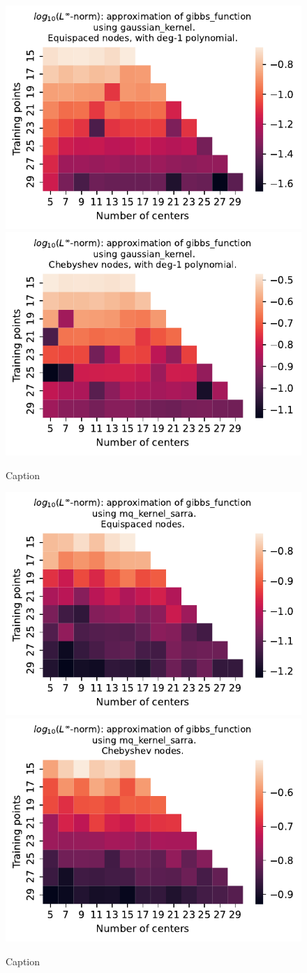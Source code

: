 \documentclass[12pt]{report} %
\begin{document}
\begin{figure}[ht]
  \centering

  \includegraphics[width=.49\textwidth]{imagenes/experiments/1d/variational/gibbs_function-Kgaussian_kernel-Poly-Equi.pdf}
  \includegraphics[width=.49\textwidth]{imagenes/experiments/1d/variational/gibbs_function-Kgaussian_kernel-Poly-Cheb.pdf}
  \caption{Caption}
  \label{fig:gibbs-gaussian-poly}
\end{figure}

\begin{figure}[ht]
  \centering

  \includegraphics[width=.49\textwidth]{imagenes/experiments/1d/variational/gibbs_function-Kmq_kernel_sarra-Equi.pdf}
  \includegraphics[width=.49\textwidth]{imagenes/experiments/1d/variational/gibbs_function-Kmq_kernel_sarra-Cheb.pdf}
  \caption{Caption}
  \label{fig:gibbs-sarra}
\end{figure}
\end{document}
